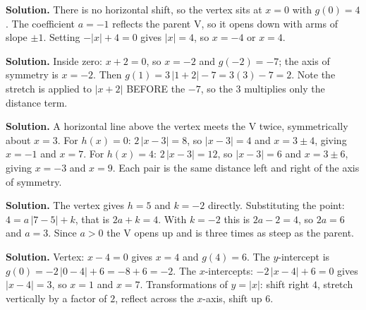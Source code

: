 \documentclass[12pt]{article}
\begin{document}


\textbf{Solution.} There is no horizontal shift, so the vertex sits at $x = 0$ with $g(0) = 4$. The coefficient $a = -1$ reflects the parent V, so it opens down with arms of slope $\pm 1$. Setting $-|x| + 4 = 0$ gives $|x| = 4$, so $x = -4$ or $x = 4$.



\textbf{Solution.} Inside zero: $x + 2 = 0$, so $x = -2$ and $g(-2) = -7$; the axis of symmetry is $x = -2$. Then $g(1) = 3\,|1 + 2| - 7 = 3(3) - 7 = 2$. Note the stretch is applied to $|x+2|$ BEFORE the $-7$, so the $3$ multiplies only the distance term.



\textbf{Solution.} A horizontal line above the vertex meets the V twice, symmetrically about $x = 3$. For $h(x) = 0$: $2\,|x - 3| = 8$, so $|x - 3| = 4$ and $x = 3 \pm 4$, giving $x = -1$ and $x = 7$. For $h(x) = 4$: $2\,|x - 3| = 12$, so $|x - 3| = 6$ and $x = 3 \pm 6$, giving $x = -3$ and $x = 9$. Each pair is the same distance left and right of the axis of symmetry.



\textbf{Solution.} The vertex gives $h = 5$ and $k = -2$ directly. Substituting the point: $4 = a\,|7 - 5| + k$, that is $2a + k = 4$. With $k = -2$ this is $2a - 2 = 4$, so $2a = 6$ and $a = 3$. Since $a > 0$ the V opens up and is three times as steep as the parent.



\textbf{Solution.} Vertex: $x - 4 = 0$ gives $x = 4$ and $g(4) = 6$. The $y$-intercept is $g(0) = -2\,|0 - 4| + 6 = -8 + 6 = -2$. The $x$-intercepts: $-2\,|x - 4| + 6 = 0$ gives $|x - 4| = 3$, so $x = 1$ and $x = 7$. Transformations of $y = |x|$: shift right $4$, stretch vertically by a factor of $2$, reflect across the $x$-axis, shift up $6$.
\end{document}

